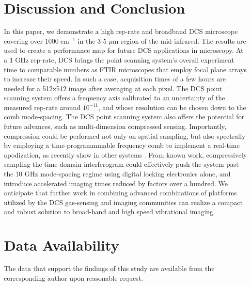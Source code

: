 \documentclass[aip,reprint]{revtex4-1}
\begin{document}
\section{Discussion and Conclusion}

In this paper, we demonstrate a high rep-rate and broadband DCS microscope covering over $1000 \; \mathrm{cm^{-1}}$ in the 3-5 $\mu$m region of the mid-infrared. The results are used to create a performance map for future DCS applications in microscopy. At a 1 GHz rep-rate, DCS brings the point scanning system's overall experiment time to comparable numbers as FTIR microscopes that employ focal plane arrays to increase their speed. In such a case, acquisition times of a few hours are needed for a 512x512 image after averaging at each pixel. The DCS point scanning system offers a frequency axis calibrated to an uncertainty of the measured rep-rate around $\mathrm{10^{-11}}$, and whose resolution can be chosen down to the comb mode-spacing. The DCS point scanning system also offers the potential for future advances, such as multi-dimension compressed sensing. Importantly, compression could be performed not only on spatial sampling, but also spectrally by employing a time-programmmable frequency comb to implement a real-time apodization, as recently show in other systems \cite{tourigny-planteApodizationDualcombSpectroscopy2020,kawaiCompressiveDualcombSpectroscopy2021,caldwellTimeprogrammableFrequencyComb2022}. From known work, compressively sampling the time domain interferogram could effectively push the system past the 10 GHz mode-spacing regime using digital locking electronics alone, and introduce accelerated imaging times reduced by factors over a hundred. We anticipate that further work in combining advanced combinations of platforms utilized by the DCS gas-sensing and imaging communities can realize a compact and robust solution to broad-band and high speed vibrational imaging. 

\section{Data Availability}
The data that support the findings of this study are available from the corresponding author upon reasonable request.


\end{document}
